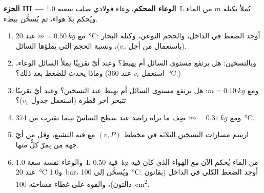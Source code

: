 \begin{problem}
\medskip
\noindent\textbf{الجزء III --- الوعاء المحكم.}
وعاء فولاذي صلب سعته \qty{1.0}{L} يُملأ بكتلة $m$ من الماء
ويُحكم بلا هواء، ثم يُسخَّن ببطء.
\begin{enumerate}[resume]
  \item مع $m = \qty{0.50}{kg}$ عند \qty{20}{\degreeCelsius}: أوجد الضغط في الداخل،
        والحجم النوعي، وكتلة البخار (باستعمال  من أجل $v_v$)،
        ونسبة الحجم التي يملؤها السائل.
  \item وبالتسخين: هل يرتفع مستوى السائل أم يهبط؟ وعند أيّ  تقريبًا يملأ السائل الوعاء، وماذا يحدث
        للضغط بعد ذلك؟ (استعمل $v_l$ عند \qty{360}{\degreeCelsius}.)
  \item ومع $m = \qty{0.10}{kg}$: هل يرتفع مستوى السائل أم يهبط عند
        التسخين؟ وعند أيّ  تقريبًا تتبخر آخر
        قطرة (استعمل جدول $v_v$)؟
  \item ومع $m = \qty{0.31}{kg}$: صِف ما يراه راصد عند
        سطح التماسّ بينما تقترب  من \qty{374}{\degreeCelsius}.
  \item ارسم مسارات التسخين الثلاثة في مخطط $(v, P)$ مع
        قبة التشبع، وقل من أيّ جهة من  يمرّ
        كلٌّ منها.
  \item والوعاء نفسه سعة \qty{1.0}{L} فيه \qty{0.50}{kg} من الماء يُحكم الآن
        \emph{مع} الهواء الذي كان فيه عند \qty{20}{\degreeCelsius}
        و\qty{1.0}{bar}، ويُسخَّن إلى \qty{100}{\degreeCelsius}: أوجد الضغط
        الكلي في الداخل (بقانون دالتون)، والقوة على غطاء مساحته \qty{100}{cm^2}.
\end{enumerate}


\end{problem}
